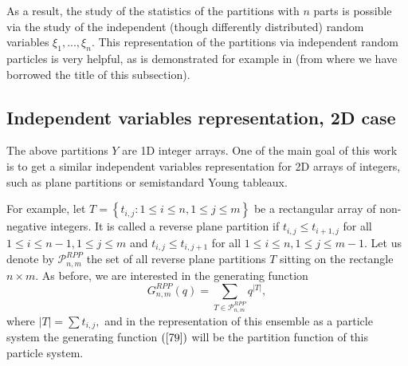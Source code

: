 \documentclass[12pt]{article}%
\begin{document}
As a result, the study of the statistics of the partitions with $n$ parts is
possible via the study of the independent (though differently distributed)
random variables $\xi_{1},...,\xi_{n}.$ This representation of the partitions
via independent random particles is very helpful, as is demonstrated for
example in \cite{DVZ} (from where we have borrowed the title of this subsection).

\subsection{Independent variables representation, 2D case}

The above partitions $Y$ are 1D integer arrays. One of the main goal of this
work is to get a similar independent variables representation for 2D arrays of
integers, such as plane partitions or semistandard Young tableaux.

For example, let $T=\left\{  t_{i,j}:1\leq i\leq n,1\leq j\leq m\right\}  $ be
a rectangular array of non-negative integers. It is called a reverse plane
partition if $t_{i,j}\leq t_{i+1,j}$ for all $1\leq i\leq n-1,1\leq j\leq m$
and $t_{i,j}\leq t_{i,j+1}$ for all $1\leq i\leq n,1\leq j\leq m-1.$ Let us
denote by $\mathcal{P}_{n,m}^{RPP}$ the set of all reverse plane partitions
$T$ sitting on the rectangle $n\times m.$ As before, we are interested in the
generating function
\begin{equation}
G_{n,m}^{RPP}\left(  q\right)  =\sum_{T\in\mathcal{P}_{n,m}^{RPP}%
}q^{\left\vert T\right\vert }, \label{79}%
\end{equation}
where $\left\vert T\right\vert =\sum t_{i,j},$ and in the representation of
this ensemble as a particle system the generating function $\left(
\ref{79}\right)  $ will be the partition function of this particle system.
\end{document}
